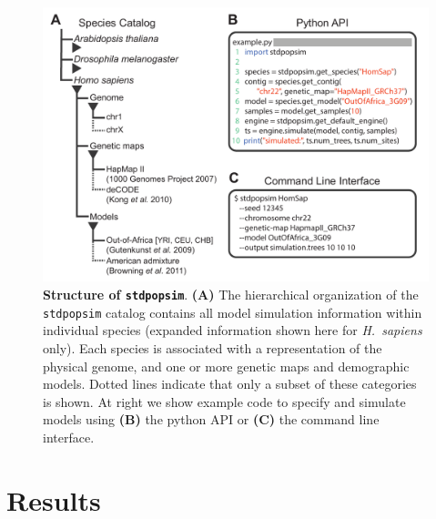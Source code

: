 \documentclass[12pt,halfline,a4paper]{ouparticle}
\newcommand{\stdpopsim}{\texttt{stdpopsim}\xspace}
\begin{document}
\begin{figure}[t]
\begin{center}
\includegraphics[width=0.7\linewidth]{display_items/Figure1.pdf}
    \caption{\textbf{Structure of \stdpopsim}. \textbf{(A)} The
hierarchical organization of the \stdpopsim catalog contains all model simulation information
within individual species (expanded information shown here for \emph{H.~sapiens} only). 
Each species is associated with a representation of the physical genome, and one or more genetic maps and demographic models.
Dotted lines indicate that only a subset of these categories is shown. 
At right we show example code to specify
and simulate models using \textbf{(B)} the python API or \textbf{(C)} the command line interface.
    }
\label{fig:cartoon}
\end{center}
\end{figure}

\section*{Results}
\end{document}
